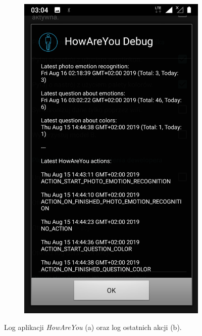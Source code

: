 \begin{figure}[H]
\begin{subfigure}{0.35\textwidth}
	\includegraphics[scale=0.13]{rozdzial3/Ustawienia_logOstatnichAkcji.png}
	\subcaption{\label{subfigure_b}}
\end{subfigure}
\caption{ Log aplikacji \textit{HowAreYou} (a) oraz log ostatnich akcji (b).}
\end{figure}



